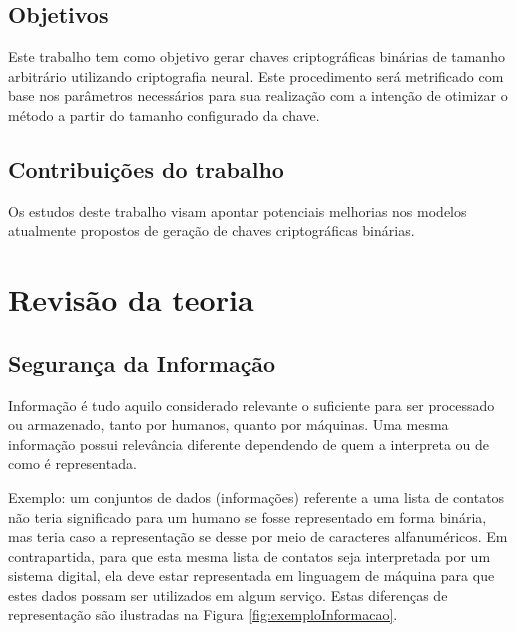 \documentclass[a4paper,10pt,oneside,conference,final,keeplastbox]{inatel}
\begin{document}
        \subsection{Objetivos}
            Este trabalho tem como objetivo gerar chaves criptográficas binárias de tamanho arbitrário utilizando criptografia neural. Este procedimento será metrificado com base nos parâmetros necessários para sua realização com a intenção de otimizar o método a partir do tamanho configurado da chave.
    
        \subsection{Contribuições do trabalho}
            Os estudos deste trabalho visam apontar potenciais melhorias nos modelos atualmente propostos de geração de chaves criptográficas binárias.

    \section{Revisão da teoria}
    \label{sec:revisao_da_teoria}

        \subsection{Segurança da Informação}
        \label{subsec:seguranca_da_informacao}
        
            Informação é tudo aquilo considerado relevante o suficiente para ser processado ou armazenado, tanto por humanos, quanto por máquinas. Uma mesma informação possui relevância diferente dependendo de quem a interpreta ou de como é representada.
            
            Exemplo: um conjuntos de dados (informações) referente a uma lista de contatos não teria significado para um humano se fosse representado em forma binária, mas teria caso a representação se desse por meio de caracteres alfanuméricos. Em contrapartida, para que esta mesma lista de contatos seja interpretada por um sistema digital, ela deve estar representada em linguagem de máquina para que estes dados possam ser utilizados em algum serviço. Estas diferenças de representação são ilustradas na Figura \ref{fig:exemploInformacao}.

            
            
\end{document}

